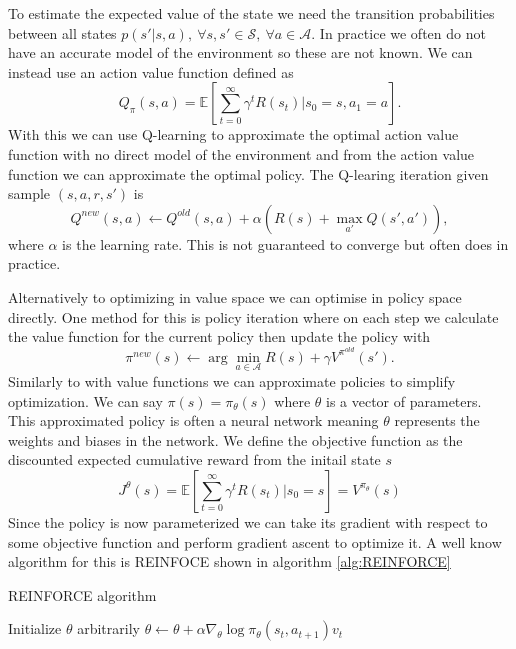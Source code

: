 To estimate the expected value of the state we need the transition probabilities between all states $p(s'|s,a), \ \forall s,s' \in \mathcal{S}, \ \forall a \in \mathcal{A}$. In practice we often do not have an accurate model of the environment so these are not known. We can instead use an action value function defined as 
\begin{equation*}
    Q_\pi(s,a) = \mathbb{E} [ \sum_{t=0}^\infty \gamma^t R(s_t)|s_0=s, a_1=a].
\end{equation*}
With this we can use Q-learning to approximate the optimal action value function with no direct model of the environment and from the action value function we can approximate the optimal policy. The Q-learing iteration given sample $(s,a,r,s')$ is 
\begin{equation*}
    Q^{new}(s,a) \leftarrow Q^{old}(s,a) + \alpha (R(s) + \max_{a'} Q(s',a')),
\end{equation*} 
where $\alpha$ is the learning rate. This is not guaranteed to converge but often does in practice.

Alternatively to optimizing in value space we can optimise in policy space directly. One method for this is policy iteration where on each step we calculate the value function for the current policy then update the policy with 
\begin{equation*}
    \pi^{new}(s) \leftarrow \arg \min_{a \in \mathcal{A}} R(s) + \gamma V^{\pi^{old}}(s').
\end{equation*}
Similarly to with value functions we can approximate policies to simplify optimization. We can say $\pi(s) = \pi_\theta (s)$ where $\theta$ is a vector of parameters. This approximated policy is often a neural network meaning $\theta$ represents the weights and biases in the network. 
We define the objective function as the discounted expected cumulative reward from the initail state $s$ 
\begin{equation*}
    J^\theta(s) = \mathbb{E} [ \sum_{t=0}^\infty \gamma^t R(s_t)|s_0=s] = V^{\pi_\theta}(s)
\end{equation*}
Since the policy is now parameterized we can take its gradient with respect to some objective function and perform gradient ascent to optimize it. A well know algorithm for this is REINFOCE \cite{REINFORCE} shown in algorithm \ref{alg:REINFORCE}

\begin{algorithm}
    \caption{REINFORCE algorithm}\label{alg:REINFORCE}
    \begin{algorithmic}
            \State Initialize $\theta$ arbitrarily
                    \State $\theta \leftarrow \theta + \alpha \nabla_\theta \log \pi_\theta(s_t,a_{t+1})v_t$ 
                \EndFor
            \EndFor
    \end{algorithmic}
\end{algorithm}




